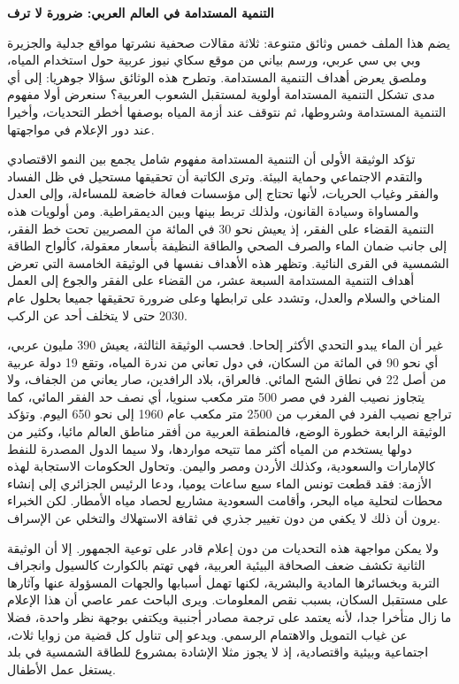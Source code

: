 \documentclass[11pt,a4paper]{article}
\begin{document}
\textbf{التنمية المستدامة في العالم العربي: ضرورة لا ترف}

يضم هذا الملف خمس وثائق متنوعة: ثلاثة مقالات صحفية نشرتها مواقع جدلية والجزيرة وبي بي سي عربي، ورسم بياني من موقع سكاي نيوز عربية حول استخدام المياه، وملصق يعرض أهداف التنمية المستدامة. وتطرح هذه الوثائق سؤالا جوهريا: إلى أي مدى تشكل التنمية المستدامة أولوية لمستقبل الشعوب العربية؟ سنعرض أولا مفهوم التنمية المستدامة وشروطها، ثم نتوقف عند أزمة المياه بوصفها أخطر التحديات، وأخيرا عند دور الإعلام في مواجهتها.

تؤكد الوثيقة الأولى أن التنمية المستدامة مفهوم شامل يجمع بين النمو الاقتصادي والتقدم الاجتماعي وحماية البيئة. وترى الكاتبة أن تحقيقها مستحيل في ظل الفساد والفقر وغياب الحريات، لأنها تحتاج إلى مؤسسات فعالة خاضعة للمساءلة، وإلى العدل والمساواة وسيادة القانون، ولذلك تربط بينها وبين الديمقراطية. ومن أولويات هذه التنمية القضاء على الفقر، إذ يعيش نحو 30 في المائة من المصريين تحت خط الفقر، إلى جانب ضمان الماء والصرف الصحي والطاقة النظيفة بأسعار معقولة، كألواح الطاقة الشمسية في القرى النائية. وتظهر هذه الأهداف نفسها في الوثيقة الخامسة التي تعرض أهداف التنمية المستدامة السبعة عشر، من القضاء على الفقر والجوع إلى العمل المناخي والسلام والعدل، وتشدد على ترابطها وعلى ضرورة تحقيقها جميعا بحلول عام 2030 حتى لا يتخلف أحد عن الركب.

غير أن الماء يبدو التحدي الأكثر إلحاحا. فحسب الوثيقة الثالثة، يعيش 390 مليون عربي، أي نحو 90 في المائة من السكان، في دول تعاني من ندرة المياه، وتقع 19 دولة عربية من أصل 22 في نطاق الشح المائي. فالعراق، بلاد الرافدين، صار يعاني من الجفاف، ولا يتجاوز نصيب الفرد في مصر 500 متر مكعب سنويا، أي نصف حد الفقر المائي، كما تراجع نصيب الفرد في المغرب من 2500 متر مكعب عام 1960 إلى نحو 650 اليوم. وتؤكد الوثيقة الرابعة خطورة الوضع، فالمنطقة العربية من أفقر مناطق العالم مائيا، وكثير من دولها يستخدم من المياه أكثر مما تتيحه مواردها، ولا سيما الدول المصدرة للنفط كالإمارات والسعودية، وكذلك الأردن ومصر واليمن. وتحاول الحكومات الاستجابة لهذه الأزمة: فقد قطعت تونس الماء سبع ساعات يوميا، ودعا الرئيس الجزائري إلى إنشاء محطات لتحلية مياه البحر، وأقامت السعودية مشاريع لحصاد مياه الأمطار. لكن الخبراء يرون أن ذلك لا يكفي من دون تغيير جذري في ثقافة الاستهلاك والتخلي عن الإسراف.

ولا يمكن مواجهة هذه التحديات من دون إعلام قادر على توعية الجمهور. إلا أن الوثيقة الثانية تكشف ضعف الصحافة البيئية العربية، فهي تهتم بالكوارث كالسيول وانجراف التربة وبخسائرها المادية والبشرية، لكنها تهمل أسبابها والجهات المسؤولة عنها وآثارها على مستقبل السكان، بسبب نقص المعلومات. ويرى الباحث عمر عاصي أن هذا الإعلام ما زال متأخرا جدا، لأنه يعتمد على ترجمة مصادر أجنبية ويكتفي بوجهة نظر واحدة، فضلا عن غياب التمويل والاهتمام الرسمي. ويدعو إلى تناول كل قضية من زوايا ثلاث، اجتماعية وبيئية واقتصادية، إذ لا يجوز مثلا الإشادة بمشروع للطاقة الشمسية في بلد يستغل عمل الأطفال.
\end{document}
